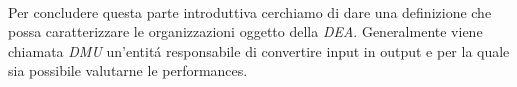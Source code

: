 \paragraph{} Per concludere questa parte introduttiva cerchiamo di dare una definizione che possa caratterizzare le organizzazioni oggetto della \emph{DEA}. Generalmente viene chiamata \emph{DMU} un'entit\'a responsabile di convertire input in output e per la quale sia possibile valutarne le performances.